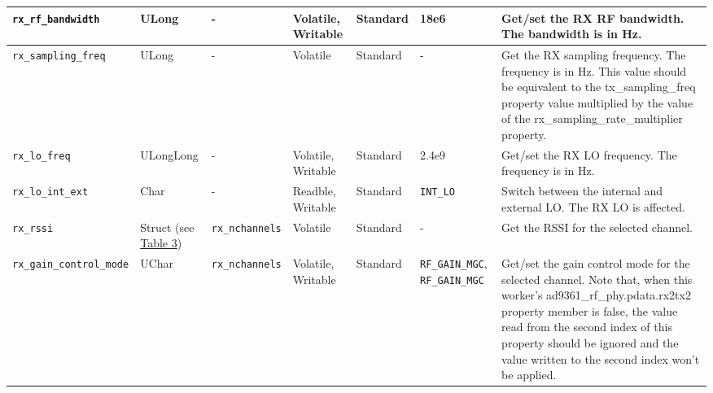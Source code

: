 \documentclass{article}
\begin{document}
\begin{landscape}
\begin{scriptsize}
\begin{longtable}{|p{3.6cm}|p{8.1cm}|p{1.4cm}|p{1.3cm}|p{1.4cm}|p{2.5cm}|p{3.6cm}|}
			\hline
			\verb+rx_rf_bandwidth+ & ULong & - & Volatile, Writable & Standard & 18e6 & Get/set the RX RF bandwidth. The bandwidth is in Hz.\\
			\hline
			\verb+rx_sampling_freq+ & ULong & - & Volatile & Standard & - & Get the RX sampling frequency. The frequency is in Hz. This value should be equivalent to the tx\_sampling\_freq property value multiplied by the value of the rx\_sampling\_rate\_multiplier property. \\
			\hline
			\verb+rx_lo_freq+ & ULongLong & - & Volatile, Writable & Standard & 2.4e9 & Get/set the RX LO frequency. The frequency is in Hz. \\
			\hline
			\verb+rx_lo_int_ext+ & Char & - & Readble, Writable & Standard & \verb+INT_LO+ & Switch between the internal and external LO. The RX LO is affected. \\
			\hline
			\verb+rx_rssi+ & Struct (see \hyperlink{tab3}{Table 3}) & \verb+rx_nchannels+ & Volatile & Standard & - & Get the RSSI for the selected channel. \\
			\hline
			\verb+rx_gain_control_mode+ & UChar & \verb+rx_nchannels+ & Volatile, Writable & Standard & \verb+RF_GAIN_MGC+, \verb+RF_GAIN_MGC+ & Get/set the gain control mode for the selected channel. Note that, when this worker's ad9361\_rf\_phy.pdata.rx2tx2 property member is false, the value read from the second index of this property should be ignored and the value written to the second index won't be applied. \\
			\hline

\end{longtable}
\end{scriptsize}
\end{landscape}
\end{document}
